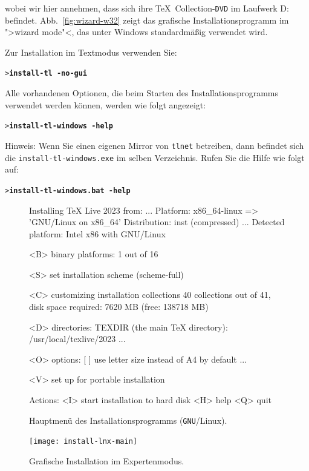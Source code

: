 \documentclass[12pt,ngerman,a4paper,fullparskip]{scrreprt}
\newcommand{\acro}[1]{\texttt{#1}}
\newcommand{\dirname}[1]{\texttt{#1}}
\newcommand{\Ucom}[1]{\textbf{\texttt{#1}}}
\def\TK{\TeX\ Collection}
\providecommand*{\DVD}{\acro{DVD}\xspace}
\providecommand*{\GNU}{\acro{GNU}\xspace}
\begin{document}
wobei wir hier annehmen, dass sich ihre \TK-\DVD im Laufwerk D: befindet.
Abb.~\ref{fig:wizard-w32} zeigt das grafische Installationsprogramm im
">wizard mode"<, das unter Windows standardmäßig verwendet wird.

Zur Installation im Textmodus verwenden Sie:
\begin{alltt}
> \Ucom{install-tl -no-gui}
\end{alltt}

\noindent Alle vorhandenen Optionen, die beim Starten des Installationsprogramms verwendet werden können, werden
wie folgt angezeigt:

\begin{alltt}
> \Ucom{install-tl-windows -help}
\end{alltt}

Hinweis: Wenn Sie einen eigenen Mirror von \dirname{tlnet} betreiben, dann befindet sich die \texttt{install-tl-windows.exe} im selben Verzeichnis. Rufen Sie die Hilfe wie folgt auf:

\begin{alltt}
> \Ucom{install-tl-windows.bat -help}
\end{alltt}


\begin{figure}[tb]
\begin{boxedverbatim}
Installing TeX Live 2023 from: ...
Platform: x86_64-linux => 'GNU/Linux on x86_64'
Distribution: inst (compressed)
...
 Detected platform: Intel x86 with GNU/Linux
 
 <B> binary platforms: 1 out of 16

 <S> set installation scheme (scheme-full)

 <C> customizing installation collections
     40 collections out of 41, disk space required: 7620 MB (free: 138718 MB)

 <D> directories:
   TEXDIR (the main TeX directory):
     /usr/local/texlive/2023
   ...

 <O> options:
   [ ] use letter size instead of A4 by default
   ...
 
 <V> set up for portable installation

Actions:
 <I> start installation to hard disk
 <H> help
 <Q> quit
\end{boxedverbatim}
\caption{Hauptmenü des Installationsprogramms (\GNU/Linux).}\label{fig:text-main}
\end{figure}

\begin{figure}[tb]
\texttt{[image: install-lnx-main]}
\caption{Grafische Installation im Expertenmodus.}\label{fig:gui-main}
\end{figure}
\end{document}
